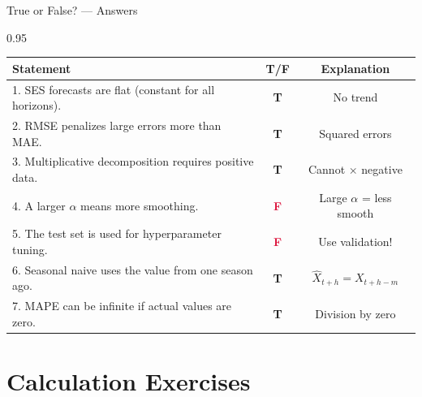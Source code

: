 \documentclass[9pt, aspectratio=169, t]{beamer}
\begin{document}
\begin{frame}{True or False? --- Answers}
    \begin{cminipage}{0.95\textwidth}
    \scriptsize
    \begin{center}
    \begin{tabular}{p{7.5cm}cc}
        \toprule
        \textbf{Statement} & \textbf{T/F} & \textbf{Explanation} \\
        \midrule
        1. SES forecasts are flat (constant for all horizons). & \textcolor{Forest}{\textbf{T}} & {\tiny No trend} \\[0.08cm]
        2. RMSE penalizes large errors more than MAE. & \textcolor{Forest}{\textbf{T}} & {\tiny Squared errors} \\[0.08cm]
        3. Multiplicative decomposition requires positive data. & \textcolor{Forest}{\textbf{T}} & {\tiny Cannot $\times$ negative} \\[0.08cm]
        4. A larger $\alpha$ means more smoothing. & \textcolor{Crimson}{\textbf{F}} & {\tiny Large $\alpha$ = less smooth} \\[0.08cm]
        5. The test set is used for hyperparameter tuning. & \textcolor{Crimson}{\textbf{F}} & {\tiny Use validation!} \\[0.08cm]
        6. Seasonal naive uses the value from one season ago. & \textcolor{Forest}{\textbf{T}} & {\tiny $\hat{X}_{t+h} = X_{t+h-m}$} \\[0.08cm]
        7. MAPE can be infinite if actual values are zero. & \textcolor{Forest}{\textbf{T}} & {\tiny Division by zero} \\
        \bottomrule
    \end{tabular}
    \end{center}
    \end{cminipage}
\end{frame}

\section{Calculation Exercises}
\end{document}
